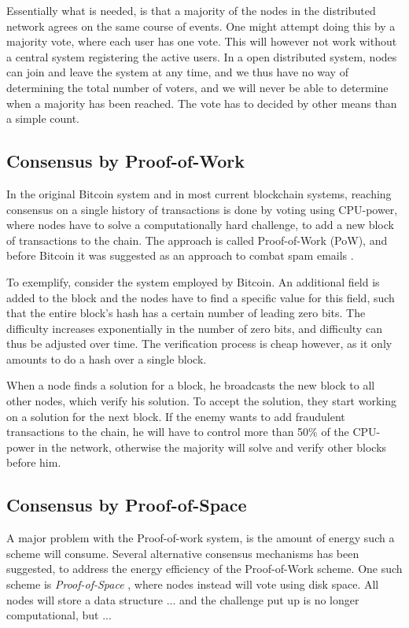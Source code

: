 \documentclass[oneside,a4paper,10pts,article]{memoir}
\begin{document}
Essentially what is needed, is that a majority of the nodes in the
distributed network agrees on the same course of events. One might
attempt doing this by a majority vote, where each user has one
vote. This will however not work without a central system registering
the active users. In a open distributed system, nodes can join and
leave the system at any time, and we thus have no way of determining
the total number of voters, and we will never be able to determine
when a majority has been reached.  The vote has to decided by other
means than a simple count.

\subsection{Consensus by Proof-of-Work}
In the original Bitcoin system and in most current blockchain systems,
reaching consensus on a single history of transactions is done by
voting using CPU-power, where nodes have to solve a computationally
hard challenge, to add a new block of transactions to the chain. The
approach is called Proof-of-Work (PoW), and before Bitcoin it was suggested
as an approach to combat spam emails \cite{dwork1992pricing}.

To exemplify, consider the system employed by Bitcoin. An additional
field is added to the block and the nodes have to find a specific
value for this field, such that the entire block's hash has a certain
number of leading zero bits. The difficulty increases exponentially in
the number of zero bits, and difficulty can thus be adjusted over
time. The verification process is cheap however, as it only amounts to
do a hash over a single block.

When a node finds a solution for a block, he broadcasts the new block
to all other nodes, which verify his solution. To accept the solution,
they start working on a solution for the next block. If the enemy
wants to add fraudulent transactions to the chain, he will have to
control more than 50\% of the CPU-power in the network, otherwise the
majority will solve and verify other blocks before him.


\subsection{Consensus by Proof-of-Space}
A major problem with the Proof-of-work system, is the amount of energy
such a scheme will consume. Several alternative consensus mechanisms
has been suggested, to address the energy efficiency of the
Proof-of-Work scheme. One such scheme is \emph{Proof-of-Space}
\cite{dziembowski2015proofs}, where nodes instead will vote using disk
space. All nodes will store a data structure ... and the challenge
put up is no longer computational, but ...
\end{document}
